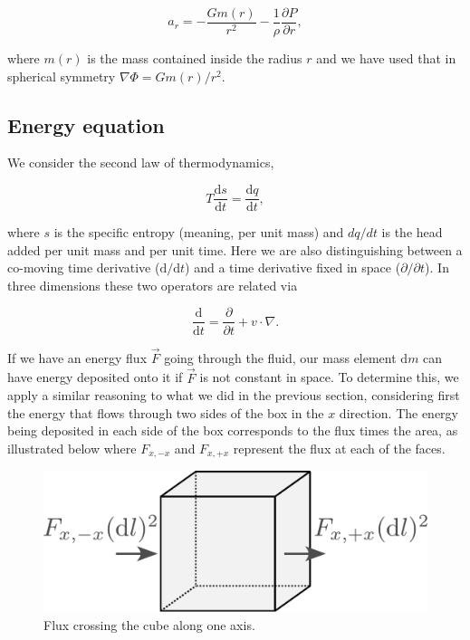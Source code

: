 \documentclass[twocolumn]{article}
\begin{document}
\[\boxed{a_r = -\frac{G m(r)}{r^2}-\frac{1}{\rho}\frac{\partial P}{\partial r},}\]

where \(m(r)\) is the mass contained inside the radius \(r\) and we have
used that in spherical symmetry \(\nabla \Phi = Gm(r)/r^2\).

\hypertarget{energy-equation}{%
\subsection{Energy equation}\label{energy-equation}}

We consider the second law of thermodynamics,

\[T\frac{\mathrm{d} s}{\mathrm{d} t}=\frac{\mathrm{d} q}{\mathrm{d} t},\]

where \(s\) is the specific entropy (meaning, per unit mass) and
\(dq/dt\) is the head added per unit mass and per unit time. Here we are
also distinguishing between a co-moving time derivative
(\(\mathrm{d}/\mathrm{d}t\)) and a time derivative fixed in space
(\(\partial /\partial t\)). In three dimensions these two operators are
related via

\[\frac{\mathrm{d}}{\mathrm{d} t} = \frac{\partial}{\partial t} + v\cdot\nabla.\]

If we have an energy flux \(\vec{F}\) going through the fluid, our mass
element \(\mathrm{d}m\) can have energy deposited onto it if \(\vec{F}\)
is not constant in space. To determine this, we apply a similar
reasoning to what we did in the previous section, considering first the
energy that flows through two sides of the box in the \(x\) direction.
The energy being deposited in each side of the box corresponds to the
flux times the area, as illustrated below where \(F_{x,-x}\) and
\(F_{x,+x}\) represent the flux at each of the faces.

\begin{figure}
\centering
\includegraphics{../assets/2_equations/flux.pdf}
\caption{Flux crossing the cube along one axis.}
\end{figure}
\end{document}
